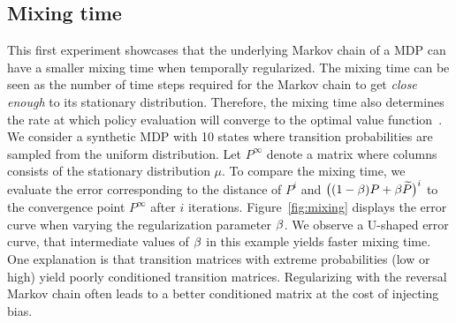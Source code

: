 \subsection{Mixing time}
This first experiment showcases that the underlying Markov chain of a MDP can have a smaller mixing time when temporally regularized. The mixing time can be seen as the number of time steps required for the Markov chain to get \emph{close enough} to its stationary distribution. Therefore, the mixing time also determines the rate at which policy evaluation will converge to the optimal value function~\cite{baxter2001infinite}. 
We consider a synthetic MDP with 10 states where transition probabilities are sampled from the uniform distribution. Let $P^{\infty}$ denote a matrix where columns consists of the stationary distribution $\mu$. To compare the mixing time, we evaluate the error corresponding to the distance of $P^i$ and $\big((1-\beta)P+\beta \widetilde{P}\big)^i$ to the convergence point $P^{\infty}$ after $i$ iterations.
%
Figure~\ref{fig:mixing} displays the error curve when varying the regularization parameter $\beta$. We observe a U-shaped error curve, that intermediate values of $\beta$ in this example yields faster mixing time.
One explanation is that transition matrices with extreme probabilities (low or high) yield poorly conditioned transition matrices. Regularizing with the reversal Markov chain often leads to a better conditioned matrix at the cost of injecting bias.
